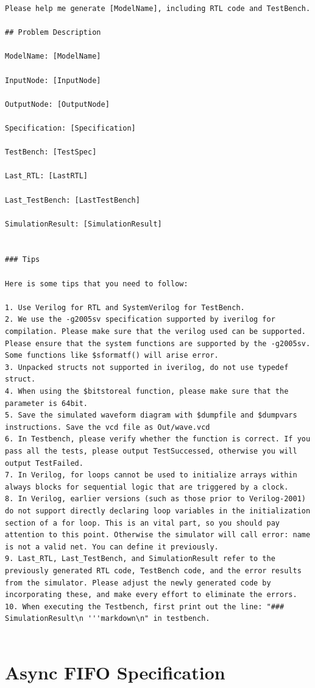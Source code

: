 \documentclass[UTF8]{ctexart}
\begin{document}
\begin{lstlisting}[frame=shadowbox]
Please help me generate [ModelName], including RTL code and TestBench.

## Problem Description

ModelName: [ModelName]

InputNode: [InputNode]

OutputNode: [OutputNode]

Specification: [Specification]

TestBench: [TestSpec]

Last_RTL: [LastRTL]

Last_TestBench: [LastTestBench]

SimulationResult: [SimulationResult]


### Tips

Here is some tips that you need to follow:

1. Use Verilog for RTL and SystemVerilog for TestBench.
2. We use the -g2005sv specification supported by iverilog for compilation. Please make sure that the verilog used can be supported. Please ensure that the system functions are supported by the -g2005sv. Some functions like $sformatf() will arise error.
3. Unpacked structs not supported in iverilog, do not use typedef struct.
4. When using the $bitstoreal function, please make sure that the parameter is 64bit.
5. Save the simulated waveform diagram with $dumpfile and $dumpvars instructions. Save the vcd file as Out/wave.vcd
6. In Testbench, please verify whether the function is correct. If you pass all the tests, please output TestSuccessed, otherwise you will output TestFailed.
7. In Verilog, for loops cannot be used to initialize arrays within always blocks for sequential logic that are triggered by a clock.
8. In Verilog, earlier versions (such as those prior to Verilog-2001) do not support directly declaring loop variables in the initialization section of a for loop. This is an vital part, so you should pay attention to this point. Otherwise the simulator will call error: name is not a valid net. You can define it previously.
9. Last_RTL, Last_TestBench, and SimulationResult refer to the previously generated RTL code, TestBench code, and the error results from the simulator. Please adjust the newly generated code by incorporating these, and make every effort to eliminate the errors.
10. When executing the Testbench, first print out the line: "### SimulationResult\n '''markdown\n" in testbench.


\end{lstlisting}

\section{Async FIFO Specification}
\end{document}
